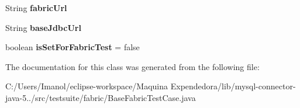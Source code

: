 \begin{DoxyCompactItemize}
String {\bfseries fabric\+Url}
\item 
\mbox{\label{classtestsuite_1_1fabric_1_1_base_fabric_test_case_a7d1cf513152534c6c35f08cb363ca026}} 
String {\bfseries base\+Jdbc\+Url}
\item 
\mbox{\label{classtestsuite_1_1fabric_1_1_base_fabric_test_case_a970d62c1a9e1f26433c5d544c98cc382}} 
boolean {\bfseries is\+Set\+For\+Fabric\+Test} = false
\end{DoxyCompactItemize}


The documentation for this class was generated from the following file\+:\begin{DoxyCompactItemize}
\item 
C\+:/\+Users/\+Imanol/eclipse-\/workspace/\+Maquina Expendedora/lib/mysql-\/connector-\/java-\/5../src/testsuite/fabric/Base\+Fabric\+Test\+Case.\+java\end{DoxyCompactItemize}
